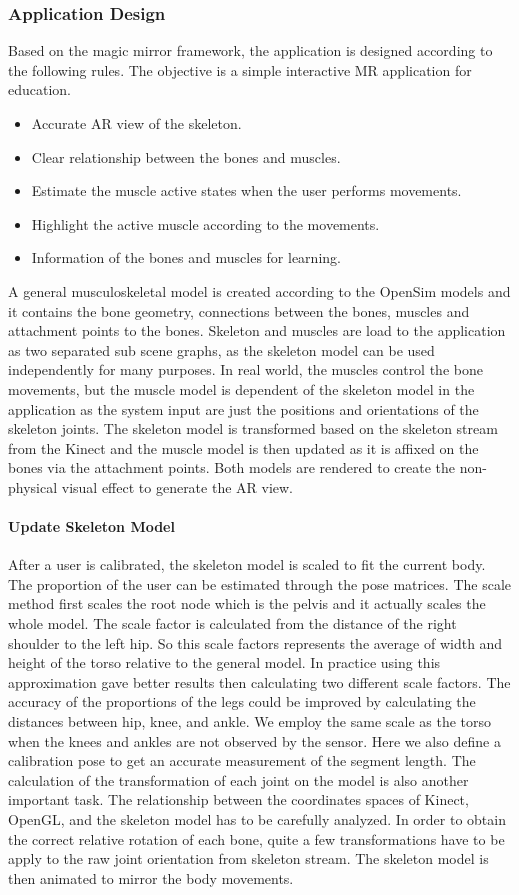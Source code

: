 \subsubsection{Application Design}
Based on the magic mirror framework, the application is designed according to the following rules. The objective is a simple interactive MR application for education.
\begin{itemize}
	\item Accurate AR view of the skeleton.
	\item Clear relationship between the bones and muscles.
	\item Estimate the muscle active states when the user performs movements.
	\item Highlight the active muscle according to the movements.
	\item Information of the bones and muscles for learning.
\end{itemize}
A general musculoskeletal model is created according to the OpenSim models and it contains the bone geometry, connections between the bones, muscles and attachment points to the bones. Skeleton and muscles are load to the application as two separated sub scene graphs, as  the skeleton model can be used independently for many purposes. In real world, the muscles control the bone movements, but the muscle model is dependent of the skeleton model in the application as the system input are just the positions and orientations of the skeleton joints. The skeleton model is transformed based on the skeleton stream from the Kinect and the muscle model is then updated as it is affixed on the bones via the attachment points. Both models are rendered to create the non-physical visual effect to generate the AR view. 

\paragraph{Update Skeleton Model}
After a user is calibrated, the skeleton model is scaled to fit the current body. The proportion of the user can be estimated through the pose matrices. The scale method first scales the root node which is the pelvis and it actually scales the whole model. 
The scale factor is calculated from the distance of the right shoulder to the left hip. So this scale factors represents the average of width and height of the torso relative to the general model. In practice using this approximation gave better results then calculating two different scale factors. 
The accuracy of the proportions of the legs could be improved by calculating the distances between hip, knee, and ankle. We employ the same scale as the torso when the knees and ankles are not observed by the sensor.
Here we also define a calibration pose to get an accurate measurement of the segment length. 
The calculation of the transformation of each joint on the model is also another important task. The relationship between the coordinates spaces of Kinect, OpenGL, and the skeleton model has to be carefully analyzed. In order to obtain the correct relative rotation of each bone, quite a few transformations have to be apply to the raw joint orientation from skeleton stream. The skeleton model is then animated to mirror the body movements.

